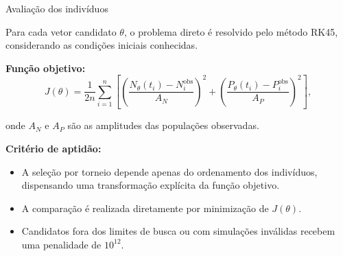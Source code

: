 \begin{frame}{Avaliação dos indivíduos}

  Para cada vetor candidato $\theta$, o problema direto é resolvido
  pelo método RK45, considerando as condições iniciais conhecidas.

  \textbf{Função objetivo:}
  \[
    J(\theta)=\frac{1}{2n}\sum_{i=1}^{n}
    \left[
      \left(\frac{N_\theta(t_i)-N_i^{\mathrm{obs}}}{A_N}\right)^2
      +
      \left(\frac{P_\theta(t_i)-P_i^{\mathrm{obs}}}{A_P}\right)^2
    \right],
  \]

  onde $A_N$ e $A_P$ são as amplitudes das populações observadas.

  \vspace{0.2cm}

  \textbf{Critério de aptidão:}
  \begin{itemize}
    \item A seleção por torneio depende apenas do ordenamento
          dos indivíduos, dispensando uma transformação explícita
          da função objetivo.
    \item A comparação é realizada diretamente por minimização
          de $J(\theta)$.
    \item Candidatos fora dos limites de busca ou com simulações
          inválidas recebem uma penalidade de $10^{12}$.
  \end{itemize}

\end{frame}

